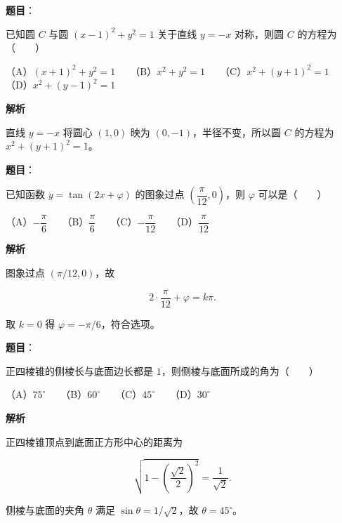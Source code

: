 \begin{answer}

\textbf{题目}：

已知圆 $C$ 与圆 $(x-1)^2+y^2=1$ 关于直线 $y=-x$ 对称，则圆 $C$ 的方程为\mbox{（　　）}

（A）$(x+1)^2+y^2=1$　　（B）$x^2+y^2=1$　　（C）$x^2+(y+1)^2=1$　　（D）$x^2+(y-1)^2=1$

\textbf{解析}

直线 $y=-x$ 将圆心 $(1,0)$ 映为 $(0,-1)$，半径不变，所以圆 $C$ 的方程为 $x^2+(y+1)^2=1$。


\end{answer}
\begin{answer}

\textbf{题目}：

已知函数 $y=\tan(2x+\varphi)$ 的图象过点 $\left(\dfrac\pi{12},0\right)$，则 $\varphi$ 可以是\mbox{（　　）}

（A）$-\dfrac\pi6$　　（B）$\dfrac\pi6$　　（C）$-\dfrac\pi{12}$　　（D）$\dfrac\pi{12}$

\textbf{解析}

图象过点 $\left(\pi/12,0\right)$，故

\nopagebreak[4]
\[
2\cdot\frac\pi{12}+\varphi=k\pi.
\]

取 $k=0$ 得 $\varphi=-\pi/6$，符合选项。


\end{answer}
\begin{answer}

\textbf{题目}：

正四棱锥的侧棱长与底面边长都是 $1$，则侧棱与底面所成的角为\mbox{（　　）}

（A）$75^\circ$　　（B）$60^\circ$　　（C）$45^\circ$　　（D）$30^\circ$

\textbf{解析}

正四棱锥顶点到底面正方形中心的距离为

\nopagebreak[4]
\[
\sqrt{1-\left(\frac{\sqrt2}{2}\right)^2}=\frac1{\sqrt2}.
\]

侧棱与底面的夹角 $\theta$ 满足 $\sin\theta=1/\sqrt2$，故 $\theta=45^\circ$。


\end{answer}
